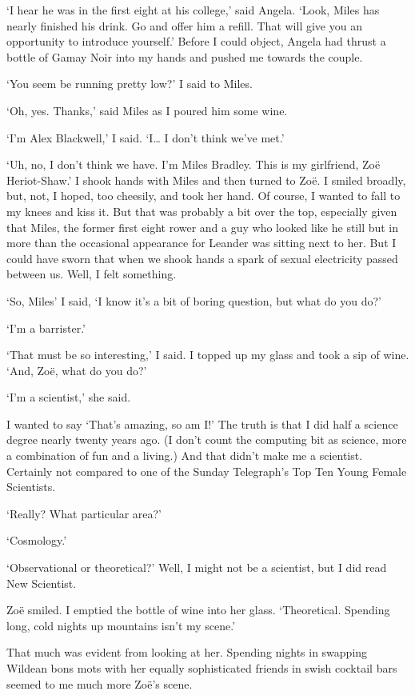 `I hear he was in the first eight at his college,' said Angela. `Look, Miles has
nearly finished his drink. Go and offer him a refill. That will give
you an opportunity to introduce yourself.' Before I could object,
Angela had thrust a bottle of Gamay Noir into my hands and pushed me
towards the couple.

`You seem be running pretty low?' I said to Miles.

`Oh, yes. Thanks,' said Miles as I poured him some wine.

`I'm Alex Blackwell,' I said. `I{\dots} I don't think we've met.'

`Uh, no, I don't think we have. I'm Miles Bradley. This is my
girlfriend, Zo{\"e} Heriot-Shaw.' I shook hands with Miles and then
turned to Zo{\"e}. I smiled broadly, but, not, I hoped, too
cheesily, and took her hand. Of course, I wanted to fall to my knees and kiss it. But
that was probably a bit over the top, especially given that
Miles, the former first eight rower and a guy who looked like he still
but in more than the occasional appearance for Leander was sitting
next to her. But I could have sworn that when we shook hands a spark
of sexual electricity passed between us. Well, I felt something.

`So, Miles' I said, `I know it's a bit of boring question, but what
do you do?'

`I'm a barrister.'

`That must be so interesting,' I said. I topped up my glass and
took a sip of wine. `And, Zo{\"e}, what do you do?'

`I'm a scientist,' she said.

I wanted to say `That's amazing, so am I!' The truth is that I did half a science degree nearly
twenty years ago. (I don't count the computing bit as science, more
a combination of fun and a living.) And that didn't make me a
scientist. Certainly not compared to one of the {\twelvesl Sunday
Telegraph}'s Top Ten Young Female Scientists.

`Really? What particular area?'

`Cosmology.'

`Observational or theoretical?' Well, I might not be a scientist,
but I did read {\twelvesl New Scientist}.

 Zo{\"e} smiled. I emptied the bottle of wine into her glass. `Theoretical. Spending long, cold nights up mountains
isn't my scene.'

That much was evident from looking at her. Spending nights in
swapping Wildean bons mots with her equally sophisticated friends in swish cocktail bars seemed
to me much more Zo{\"e}'s scene.

